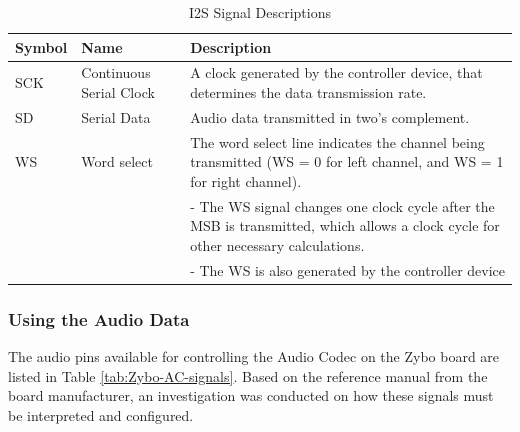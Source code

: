 \begin{table}[h]
    \centering
    \begin{tabular}{|p{1.3cm}|p{2cm}|p{12cm}|}
        \hline
        \textbf{Symbol} & \textbf{Name} & \textbf{Description} \\
        \hline
        SCK & Continuous Serial Clock & A clock generated by the controller device, that determines the data transmission rate.\\
        \hline
        SD & Serial Data & Audio data transmitted in two's complement. \\
        \hline
        WS & Word select & The word select line indicates the channel being transmitted (WS = 0 for left channel, and WS = 1 for right channel).\\
        & & - The WS signal changes one clock cycle after the MSB is transmitted, which allows a clock cycle for other necessary calculations.\\
        & & - The WS is also generated by the controller device\\
        \hline
    \end{tabular}
    \caption{I2S Signal Descriptions}
    \label{tab:i2s-signal-descriptions}
\end{table}

\subsubsection{Using the Audio Data}

The audio pins available for controlling the Audio Codec on the Zybo board are listed in Table \ref{tab:Zybo-AC-signals}. Based on the reference manual\cite{zybo-ref-man} from the board manufacturer, an investigation was conducted on how these signals must be interpreted and configured.

